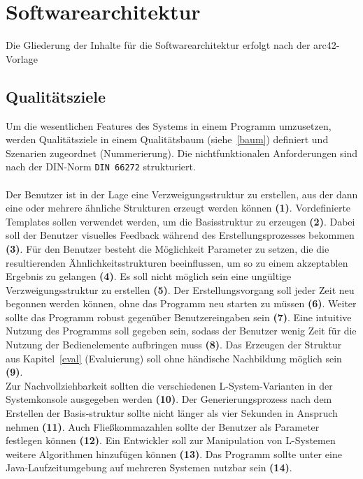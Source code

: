 \section{Softwarearchitektur}
Die Gliederung der Inhalte für die Softwarearchitektur erfolgt nach der arc42-Vorlage~\cite{arc42}

\subsection*{Qualitätsziele}
Um die wesentlichen Features des Systems in einem Programm umzusetzen, werden Qualitätsziele in einem Qualitätsbaum
(siehe~\ref{baum}) definiert und Szenarien zugeordnet (Nummerierung).
Die nichtfunktionalen Anforderungen sind nach der DIN-Norm \texttt{DIN 66272} strukturiert.\\~\\
Der Benutzer ist in der Lage eine Verzweigungsstruktur zu erstellen, aus der dann eine oder mehrere ähnliche Strukturen
erzeugt werden können \textbf{(1)}.
Vordefinierte Templates sollen verwendet werden, um die Basisstruktur zu erzeugen \textbf{(2)}.
Dabei soll der Benutzer visuelles Feedback während des Erstellungsprozesses bekommen \textbf{(3)}.
Für den Benutzer besteht die Möglichkeit Parameter zu setzen, die die resultierenden Ähnlichkeitsstrukturen beeinflussen,
um so zu einem akzeptablen Ergebnis zu gelangen \textbf{(4)}.
Es soll nicht möglich sein eine ungültige Verzweigungsstruktur zu erstellen \textbf{(5)}.
Der Erstellungsvorgang soll jeder Zeit neu begonnen werden können, ohne das Programm neu starten zu müssen \textbf{(6)}.
Weiter sollte das Programm robust gegenüber Benutzereingaben sein \textbf{(7)}.
Eine intuitive Nutzung des Programms soll gegeben sein, sodass der Benutzer wenig Zeit für die Nutzung der Bedienelemente
aufbringen muss \textbf{(8)}.
Das Erzeugen der Struktur aus Kapitel~\ref{eval} (Evaluierung) soll ohne händische Nachbildung möglich sein \textbf{(9)}.\\
Zur Nachvollziehbarkeit sollten die verschiedenen L-System-Varianten in der Systemkonsole ausgegeben werden \textbf{(10)}.
Der Generierungsprozess nach dem Erstellen der Basis-struktur sollte nicht länger als vier Sekunden in Anspruch nehmen \textbf{(11)}.
Auch Fließkommazahlen sollte der Benutzer als Parameter festlegen können \textbf{(12)}.
Ein Entwickler soll zur Manipulation von L-Systemen weitere Algorithmen hinzufügen können \textbf{(13)}.
Das Programm sollte unter eine Java-Laufzeitumgebung auf mehreren Systemen nutzbar sein \textbf{(14)}.

